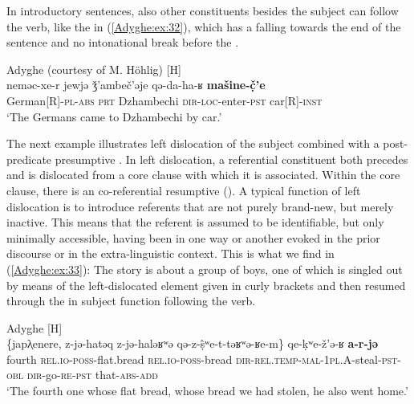 \documentclass[output=paper,colorlinks,citecolor=brown, draft]{langscibook}
\begin{document}
In introductory  sentences, also other constituents besides the subject can follow the verb, like the  in (\ref{Adyghe:ex:32}), which has a falling  towards the end of the sentence and no intonational break before the .

\ea\label{Adyghe:ex:32}
Adyghe (courtesy of M. Höhlig) [H] \\
\gll neməc-xe-r jewjə ǯ'ambeč'əje qə-da-ha-ʁ \textbf{mašine-č̣'e} \\
German[R]\textsc{-pl}\textsc{-abs} \textsc{prt} Dzhambechi \textsc{dir-}\textsc{loc-}enter\textsc{-pst} car[R]\textsc{-inst} \\
 `The Germans came to Dzhambechi by car.' 
\z

The next example illustrates left dislocation of the subject combined with a post-predicate presumptive . In left dislocation, a referential constituent both precedes and is dislocated from a core clause with which it is associated. Within the core clause, there is an  
co-referential resumptive  (\citealt{westbury2016left}). A typical function of left dislocation is to introduce referents that are not purely brand-new, but merely inactive. This means that the referent is assumed to be identifiable, but only minimally accessible, having been in one way or another evoked in the prior discourse or in the extra-linguistic context. This is what we find in (\ref{Adyghe:ex:33}): The story is about a group of boys, one of which is singled out by means of the left-dislocated element given in curly brackets and then resumed through the  in subject function following the verb.

\ea\label{Adyghe:ex:33}
Adyghe \citep[234]{hohlig1997kontaktbedingter} [H] \\
\gll \{japλ̣enere, z-jə-hatəq z-jə-haləʁʷə qə-z-ṣ̂ʷe-t-təʁʷə-ʁe-m\} qe-ḳʷe-ž'ə-ʁ \textbf{a-r-jə} \\
fourth \textsc{rel.}\textsc{io-}\textsc{poss-}flat.bread \textsc{rel.}\textsc{io-}\textsc{poss-}bread \textsc{dir-}\textsc{rel.}\textsc{temp-mal-}\textsc{1pl.A-}steal\textsc{-pst}\textsc{-obl} \textsc{dir-}go\textsc{-re-pst} that\textsc{-abs}\textsc{-add} \\
 `The fourth one whose flat bread, whose bread we had stolen, he also went home.'
\z
\end{document}
